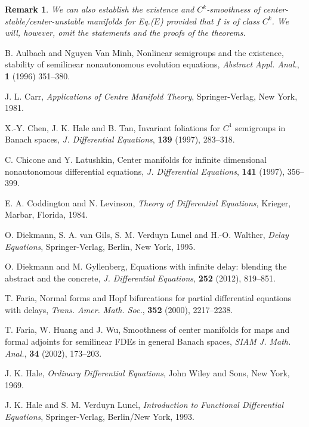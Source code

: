 \documentclass[12pt]{amsart}
\newtheorem{Rem}{Remark}
\begin{document}
\begin{Rem} {\rm 
We can also establish the existence and $C^k$-smoothness of 
center-stable/center-unstable manifolds for Eq.($E$) provided that 
$f$ is of class $C^k$. We will, however, omit the statements and 
the proofs of the theorems.  }     
\end{Rem}

\vspace{5mm}

\begin{thebibliography}{10}

B. Aulbach and Nguyen Van Minh, Nonlinear semigroups and the existence, 
stability of semilinear nonautonomous evolution equations, 
{\it Abstract Appl. Anal.}, {\bf 1} (1996) 351--380.

J. L. Carr, {\it Applications of Centre Manifold Theory}, 
Springer-Verlag, New York, 1981.

X.-Y. Chen, J. K. Hale and B. Tan, Invariant foliations for $C^1$ 
semigroups in Banach spaces,
{\it J. Differential Equations}, {\bf 139} (1997), 283--318.

C. Chicone and Y. Latushkin, Center manifolds for infinite dimensional 
nonautonomous differential equations, 
{\it J. Differential Equations}, {\bf 141} (1997), 356--399.

E. A. Coddington and N. Levinson, {\it Theory of Differential Equations}, 
Krieger, Marbar, Florida, 1984.

O. Diekmann, S. A. van Gils, S. M. Verduyn Lunel and H.-O. Walther, 
{\it Delay Equations}, 
Springer-Verlag, Berlin, New York, 1995.

O. Diekmann and M. Gyllenberg, Equations with infinite delay: 
blending the abstract and the concrete, 
{\it J. Differential Equations}, {\bf 252} (2012), 819--851. 

T. Faria, Normal forms and Hopf bifurcations for partial differential 
equations with delays, 
{\it Trans. Amer. Math. Soc.}, {\bf 352} (2000), 2217--2238.

T. Faria, W. Huang and J. Wu, Smoothness of center manifolds for maps 
and formal adjoints for semilinear FDEs in general Banach spaces, 
{\it SIAM J. Math. Anal.}, {\bf 34} (2002), 173--203.

J. K. Hale, {\it Ordinary Differential Equations}, 
John Wiley and Sons, New York, 1969.

J. K. Hale and S. M. Verduyn Lunel,
{\it Introduction to Functional Differential Equations},
Springer-Verlag, Berlin/New York, 1993. 


\end{thebibliography}
\end{document}
